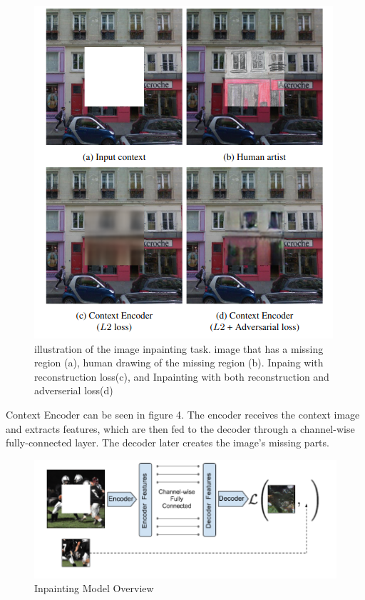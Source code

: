 \documentclass{article}
\begin{document}
\begin{figure}[H]
   \centering
   \includegraphics[width=0.8\linewidth]{figures/inpainting.png}
   \caption{ illustration of the image inpainting task.
   image that has a missing region (a),
   human drawing of the missing region (b).
   Inpaing with reconstruction loss(c),
   and Inpainting with both reconstruction and adverserial loss(d)}
   \end{figure}
 
   Context Encoder can be seen in figure 4.
   The encoder receives the context image 
   and extracts features, 
   which are then fed to the decoder through 
   a channel-wise fully-connected layer.
   The decoder later creates the image's missing parts. 
 
\begin{figure}[H]
       \centering
       \includegraphics[width=0.8\linewidth]{figures/inpaintin_model.png}
       \caption{ Inpainting Model Overview}
       \end{figure}
 
\end{document}
